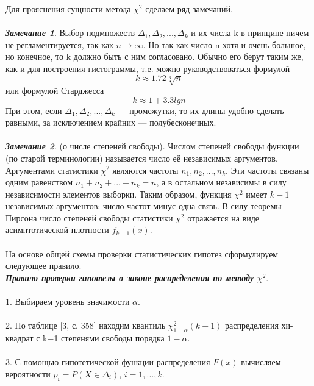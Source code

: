 Для прояснения сущности метода $\chi^{2}$ сделаем ряд замечаний.
\\\\
\textbf{\textit{Замечание 1}}. Выбор подмножеств $\Delta_{1},\Delta_{2}, ... ,\Delta_{k}$ и их числа k в принципе ничем не регламентируется, так как $n \rightarrow \infty$. Но так как число n хотя и очень большое, но конечное, то k должно быть с ним согласовано. Обычно его берут таким же, как и для построения гистограммы, т.е. можно руководствоваться формулой
\begin{equation}
k \approx 1.72\sqrt[3]{n}
\label{k_1}
\end{equation}
или формулой Старджесса
\begin{equation}
k \approx 1 + 3.3lgn
\end{equation}
При этом, если  $\Delta_{1},\Delta_{2}, ... ,\Delta_{k}$ — промежутки, то их длины удобно сделать равными, за исключением крайних — полубесконечных.
\\\\
\textbf{\textit{Замечание 2}}. (о числе степеней свободы).
Числом степеней свободы функции (по старой терминологии) называется число её независимых аргументов. Аргументами статистики $\chi^{2}$ являются частоты $n_{1},n_{2}, ... ,n_{k}$. Эти частоты связаны одним равенством $n_{1} + n_{2} + ... + n_{k}  = n$, а в остальном независимы в силу независимости элементов выборки. Таким образом, функция $\chi^{2}$  имеет $k-1$ независимых аргументов: число частот минус одна связь. В силу теоремы Пирсона число степеней свободы статистики $\chi^{2}$  отражается на виде асимптотической плотности $f_{k - 1}(x)$.
\\\\
На основе общей схемы проверки статистических гипотез сформулируем следующее правило.
\\
\textbf{\textit{Правило проверки гипотезы о законе распределения по методу $\chi^{2}$}}.
\\\\
1. Выбираем уровень значимости $\alpha$.
\\\\
2. По таблице [3, с. 358] находим квантиль $\chi^{2}_{1-\alpha}(k - 1)$ распределения хи-квадрат с k$-$1 степенями свободы порядка $1-\alpha$. 
\\\\
3. С помощью гипотетической функции распределения $F(x)$ вычисляем вероятности $p_{i} = P (X \in \Delta_{i})$, $i = 1, ... ,k$.
\\\\
